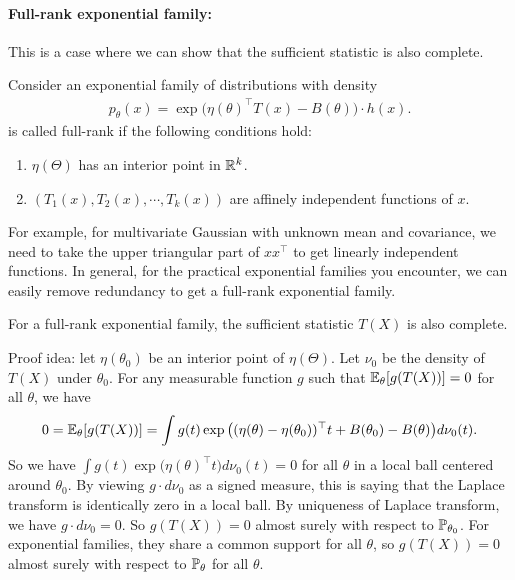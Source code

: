 \documentclass[11pt,letterpaper]{article}
\numberwithin{theorem}{lecture}
\numberwithin{proposition}{lecture}
\numberwithin{lemma}{lecture}
\numberwithin{claim}{lecture}
\numberwithin{corollary}{lecture}
\numberwithin{definition}{lecture}
\numberwithin{conjecture}{lecture}
\numberwithin{remark}{lecture}
\numberwithin{example}{lecture}
\numberwithin{equation}{lecture}
\begin{document}
\paragraph{Full-rank exponential family:} This is a case where we can show that the sufficient statistic is also complete.
\begin{definition}
  Consider an exponential family of distributions with density
  \begin{align*}
    p_\theta (x) = \exp \big( \eta (\theta)^\top T (x) - B (\theta) \big) \cdot h (x).
  \end{align*}
  is called full-rank if the following conditions hold:
  \begin{enumerate}
    \item $\eta (\Theta)$ has an interior point in $\mathbb{R}^k$.
    \item $(T_1 (x), T_2 (x), \cdots, T_k (x))$ are affinely independent functions of $x$.
  \end{enumerate}
\end{definition}
For example, for multivariate Gaussian with unknown mean and covariance, we need to take the upper triangular part of $xx^\top$ to get linearly independent functions. In general, for the practical exponential families you encounter, we can easily remove redundancy to get a full-rank exponential family.
\begin{theorem}
  For a full-rank exponential family, the sufficient statistic $T(X)$ is also complete.
\end{theorem}
Proof idea: let $\eta (\theta_0)$ be an interior point of $\eta (\Theta)$. Let $\nu_0$ be the density of $T(X)$ under $\theta_0$. For any measurable function $g$ such that ${\mathbb{E}}_\theta [g(T(X))] = 0$ for all $\theta$, we have
\begin{align*}
    0 = {\mathbb{E}}_\theta [g(T(X))] = \int g (t) \exp \big( (\eta (\theta) - \eta (\theta_0))^\top t + B (\theta_0) - B (\theta)  \big) d\nu_0 (t).
\end{align*}
So we have $\int g (t) \exp \big( \eta (\theta)^\top t   \big) d\nu_0 (t) = 0$ for all $\theta$ in a local ball centered around $\theta_0$. By viewing $g \cdot d \nu_0$ as a signed measure, this is saying that the Laplace transform is identically zero in a local ball. By uniqueness of Laplace transform, we have $g \cdot d \nu_0 = 0$. So $g(T(X)) = 0$ almost surely with respect to ${\mathbb{P}}_{\theta_0}$. For exponential families, they share a common support for all $\theta$, so $g(T(X)) = 0$ almost surely with respect to ${\mathbb{P}}_\theta$ for all $\theta$.
\end{document}
